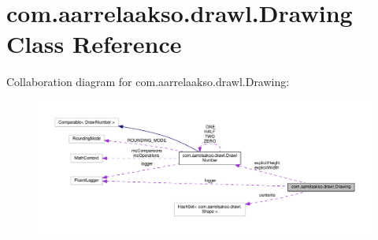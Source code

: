 \hypertarget{classcom_1_1aarrelaakso_1_1drawl_1_1_drawing}{}\section{com.\+aarrelaakso.\+drawl.\+Drawing Class Reference}
\label{classcom_1_1aarrelaakso_1_1drawl_1_1_drawing}


Collaboration diagram for com.\+aarrelaakso.\+drawl.\+Drawing\+:
\nopagebreak
\begin{figure}[H]
\begin{center}
\leavevmode
\includegraphics[width=350pt]{dd/db2/classcom_1_1aarrelaakso_1_1drawl_1_1_drawing__coll__graph}
\end{center}
\end{figure}
